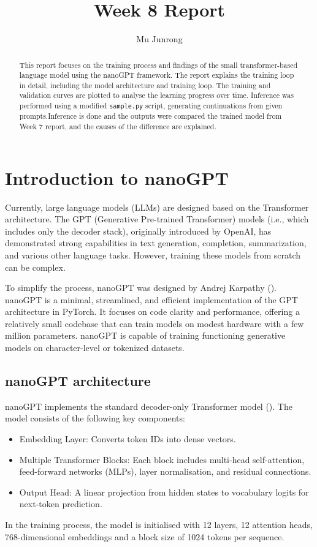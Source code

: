 \documentclass{article} %
\title{Week 8 Report}
\author{Mu Junrong}
\begin{document}
\ifcolmsubmission
\linenumbers
\fi

\maketitle

\begin{abstract}
This report focuses on the training process and findings of the small transformer-based language model using the nanoGPT framework. The report explains the training loop in detail, including the model architecture and training loop. The training and validation curves are plotted to analyse the learning progress over time. Inference was performed using a modified \texttt{sample.py} script, generating continuations from given prompts.Inference is done and the outputs were compared the trained model from Week 7 report, and the causes of the difference are explained.
\end{abstract}

\section{Introduction to nanoGPT}
Currently, large language models (LLMs) are designed based on the Transformer architecture. The GPT (Generative Pre-trained Transformer) models (i.e., which includes only the decoder stack), originally introduced by OpenAI, has demonstrated strong capabilities in text generation, completion, summarization, and various other language tasks. However, training these models from scratch can be complex.

To simplify the process, nanoGPT was designed by Andrej Karpathy (\cite{nanoGPT}). nanoGPT is a minimal, streamlined, and efficient implementation of the GPT architecture in PyTorch. It focuses on code clarity and performance, offering a relatively small codebase that can train models on modest hardware with a few million parameters. nanoGPT is capable of training functioning generative models on character-level or tokenized datasets.

\subsection{nanoGPT architecture}
nanoGPT implements the standard decoder-only Transformer model (\cite{vaswani2017attention}). The model consists of the following key components:
\begin{itemize}
    \item Embedding Layer: Converts token IDs into dense vectors.
    \item Multiple Transformer Blocks: Each block includes multi-head self-attention, feed-forward networks (MLPs), layer normalisation, and residual connections.
    \item Output Head: A linear projection from hidden states to vocabulary logits for next-token prediction.
\end{itemize}
In the training process, the model is initialised with 12 layers, 12 attention heads, 768-dimensional embeddings and a block size of 1024 tokens per sequence.
\end{document}
